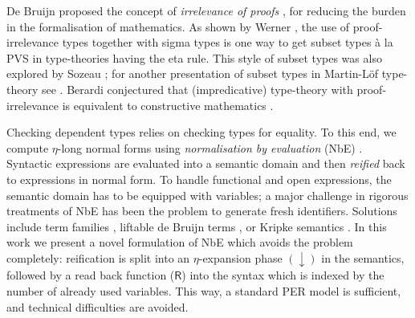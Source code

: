 \documentclass{LMCS}
\theoremstyle{plain}\newtheorem{satz}[thm]{Satz}
\newcommand{\LONGVERSION}[1]{#1}
\newcommand{\LONGVERSION}[1]{}
\begin{document}
De Bruijn proposed the concept of \emph{irrelevance of proofs} \cite{aut-4},
for reducing the burden in the formalisation of mathematics.  As shown
by Werner \cite{werner:strengthProofIrrelevance}, the use of
proof-irrelevance types together with sigma types is one way to get
subset types \`a la PVS \cite{pvs-sub} in type-theories having the
eta rule.  This style of subset types was also explored by Sozeau
\cite[Sec.~3.3]{sozeau:types06}\LONGVERSION{; for another presentation of subset types in
  Martin-L\"{o}f type-theory see \cite{sambin}}.
\LONGVERSION{Berardi conjectured that
  (impredicative) type-theory with proof-irrelevance is equivalent to
  constructive mathematics \cite{berardi}.}

































Checking dependent types relies on checking types for equality.  To
this end, we compute $\eta$-long normal forms using
\emph{normalisation by evaluation} (NbE) \cite{martinlof:jaist04}.  
Syntactic expressions are evaluated into a semantic domain and then
\emph{reified} back to expressions in normal form.
To handle functional and
open expressions, the semantic domain has to be equipped
with variables; a major challenge in rigorous treatments of NbE has
been the problem to generate fresh identifiers.
Solutions include term families \cite{bergerSchwichtenberg:lics91},
liftable de Bruijn terms \cite{aehlig:nbe}, or Kripke semantics
\cite{abelCoquandDybjer:mpc08}.  In this work we present a novel
formulation of NbE which avoids the problem completely: reification is
split into an $\eta$-expansion phase $(\downarrow)$ in the semantics,
followed by a read back function ($\mathsf{R}$)
into the syntax which is indexed by
the number of already used variables.  This way, a standard PER
model is sufficient, and technical difficulties are avoided.
\end{document}
